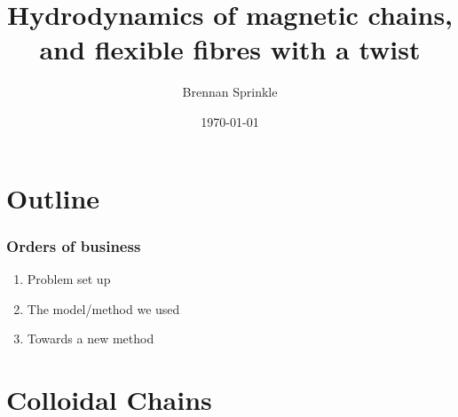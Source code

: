 \documentclass{beamer}
\title{Hydrodynamics of magnetic chains, and flexible fibres with a twist}
\date{\today}
\author{Brennan Sprinkle}
\begin{document}
  \maketitle
  
\section{Outline}
\begin{frame}
\frametitle{Orders of business}
\begin{enumerate}
\item Problem set up 
\item The model/method we used
\item Towards a new method
\end{enumerate}
\end{frame}  
  
\section{Colloidal Chains}

{%
\begin{frame}[plain]
\end{frame}
}%


{%
\begin{frame}[plain]
\end{frame}
}%
\end{document}
